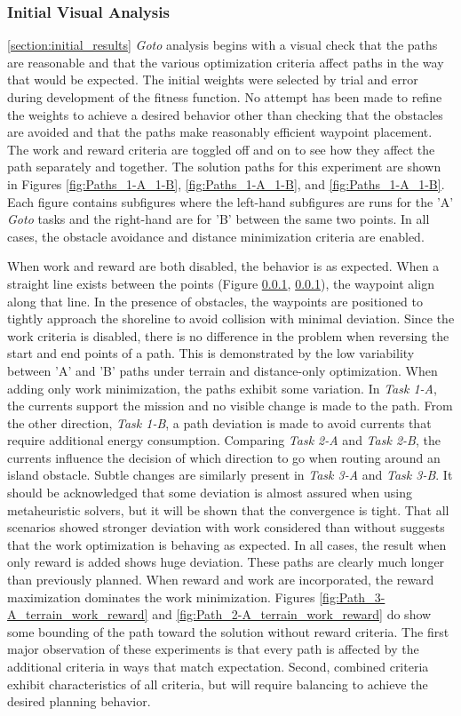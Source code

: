 \documentclass{tamuccthesis}
\begin{document}
\subsubsection{Initial Visual Analysis}
\ref{section:initial_results}
\textit{Goto} analysis begins with a visual check that the paths are reasonable and that the various optimization criteria affect paths in the way that would be expected. The initial weights were selected by trial and error during development of the fitness function. No attempt has been made to refine the weights to achieve a desired behavior other than checking that the obstacles are avoided and that the paths make reasonably efficient waypoint placement. The work and reward criteria are toggled off and on to see how they affect the path separately and together. The solution paths for this experiment are shown in Figures \ref{fig:Paths_1-A_1-B}, \ref{fig:Paths_1-A_1-B}, and \ref{fig:Paths_1-A_1-B}. Each figure contains subfigures where the left-hand subfigures are runs for the 'A' \textit{Goto} tasks and the right-hand are for 'B' between the same two points. In all cases, the obstacle avoidance and distance minimization criteria are enabled.

When work and reward are both disabled, the behavior is as expected. When a straight line exists between the points (Figure \ref{}, \ref{}), the waypoint align along that line. In the presence of obstacles, the waypoints are positioned to tightly approach the shoreline to avoid collision with minimal deviation. Since the work criteria is disabled, there is no difference in the problem when reversing the start and end points of a path. This is demonstrated by the low variability between 'A' and 'B' paths under terrain and distance-only optimization. When adding only work minimization, the paths exhibit some variation. In \textit{Task 1-A}, the currents support the mission and no visible change is made to the path. From the other direction, \textit{Task 1-B}, a path deviation is made to avoid currents that require additional energy consumption. Comparing \textit{Task 2-A} and \textit{Task 2-B}, the currents influence the decision of which direction to go when routing around an island obstacle. Subtle changes are similarly present in \textit{Task 3-A} and \textit{Task 3-B}. It should be acknowledged that some deviation is almost assured when using metaheuristic solvers, but it will be shown that the convergence is tight. That all scenarios showed stronger deviation with work considered than without suggests that the work optimization is behaving as expected. In all cases, the result when only reward is added shows huge deviation. These paths are clearly much longer than previously planned. When reward and work are incorporated, the reward maximization dominates the work minimization. Figures \ref{fig:Path_3-A_terrain_work_reward} and \ref{fig:Path_2-A_terrain_work_reward} do show some bounding of the path toward the solution without reward criteria. The first major observation of these experiments is that every path is affected by the additional criteria in ways that match expectation. Second, combined criteria exhibit characteristics of all criteria, but will require balancing to achieve the desired planning behavior.
\end{document}
